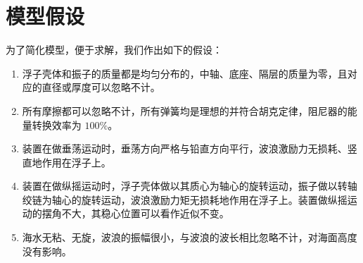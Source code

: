 \section{模型假设}

为了简化模型，便于求解，我们作出如下的假设：

\begin{enumerate}
    \item 浮子壳体和振子的质量都是均匀分布的，中轴、底座、隔层的质量为零，且对应的直径或厚度可以忽略不计。
    \item 所有摩擦都可以忽略不计，所有弹簧均是理想的并符合胡克定律，阻尼器的能量转换效率为 $100\%$。
    \item 装置在做垂荡运动时，垂荡方向严格与铅直方向平行，波浪激励力无损耗、竖直地作用在浮子上。
    \item 装置在做纵摇运动时，浮子壳体做以其质心为轴心的旋转运动，振子做以转轴绞链为轴心的旋转运动，波浪激励力矩无损耗地作用在浮子上。装置做纵摇运动的摆角不大，其稳心位置可以看作近似不变。
    \item 海水无粘、无旋，波浪的振幅很小，与波浪的波长相比忽略不计，对海面高度没有影响。
\end{enumerate}